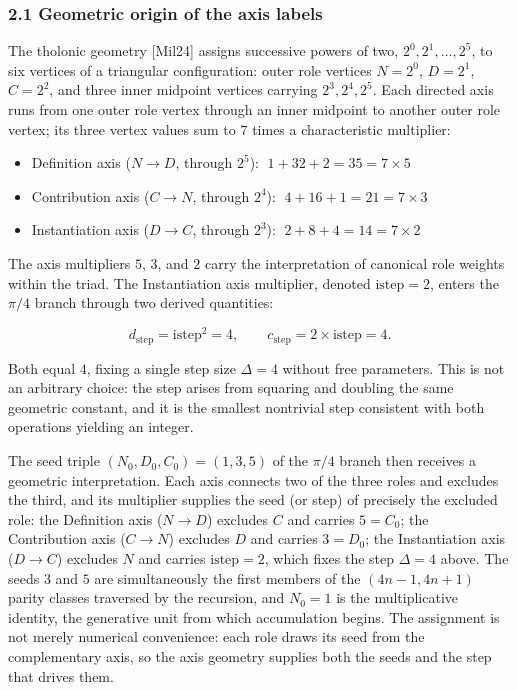 \documentclass[
  11pt,
  letterpaper,
]{article}
\providecommand{\tightlist}{%
  \setlength{\itemsep}{0pt}\setlength{\parskip}{0pt}}
\begin{document}
\subsubsection{2.1 Geometric origin of the axis
labels}\label{geometric-origin-of-the-axis-labels}

The tholonic geometry {[}Mil24{]} assigns successive powers of two,
\(2^0, 2^1, \ldots, 2^5\), to six vertices of a triangular
configuration: outer role vertices \(N = 2^0\), \(D = 2^1\),
\(C = 2^2\), and three inner midpoint vertices carrying
\(2^3, 2^4, 2^5\). Each directed axis runs from one outer role vertex
through an inner midpoint to another outer role vertex; its three vertex
values sum to \(7\) times a characteristic multiplier:

\begin{itemize}
\tightlist
\item
  Definition axis (\(N \to D\), through \(2^5\)):
  \(\;1 + 32 + 2 = 35 = 7 \times 5\)
\item
  Contribution axis (\(C \to N\), through \(2^4\)):
  \(\;4 + 16 + 1 = 21 = 7 \times 3\)
\item
  Instantiation axis (\(D \to C\), through \(2^3\)):
  \(\;2 + 8 + 4 = 14 = 7 \times 2\)
\end{itemize}

The axis multipliers \(5\), \(3\), and \(2\) carry the interpretation of
canonical role weights within the triad. The Instantiation axis
multiplier, denoted \(\mathrm{istep} = 2\), enters the \(\pi/4\) branch
through two derived quantities:

\[d_{\mathrm{step}} = \mathrm{istep}^2 = 4, \qquad c_{\mathrm{step}} = 2 \times \mathrm{istep} = 4.\]

Both equal \(4\), fixing a single step size \(\Delta = 4\) without free
parameters. This is not an arbitrary choice: the step arises from
squaring and doubling the same geometric constant, and it is the
smallest nontrivial step consistent with both operations yielding an
integer.

The seed triple \((N_0, D_0, C_0) = (1, 3, 5)\) of the \(\pi/4\) branch
then receives a geometric interpretation. Each axis connects two of the
three roles and excludes the third, and its multiplier supplies the seed
(or step) of precisely the excluded role: the Definition axis
(\(N \to D\)) excludes \(C\) and carries \(5 = C_0\); the Contribution
axis (\(C \to N\)) excludes \(D\) and carries \(3 = D_0\); the
Instantiation axis (\(D \to C\)) excludes \(N\) and carries
\(\mathrm{istep} = 2\), which fixes the step \(\Delta = 4\) above. The
seeds \(3\) and \(5\) are simultaneously the first members of the
\((4n-1, 4n+1)\) parity classes traversed by the recursion, and
\(N_0 = 1\) is the multiplicative identity, the generative unit from
which accumulation begins. The assignment is not merely numerical
convenience: each role draws its seed from the complementary axis, so
the axis geometry supplies both the seeds and the step that drives them.
\end{document}
